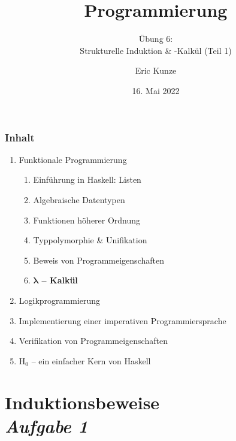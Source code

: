 \documentclass{beamer}
\begin{document}
	
	\title{Programmierung}
	\subtitle{Übung 6: \\ Strukturelle Induktion \& \textlambda-Kalkül (Teil 1)}
	\author{Eric Kunze}
	\date{16. Mai 2022}
	
	\maketitle
	


\begin{frame}[fragile] \frametitle{Inhalt}
	\begin{enumerate}
		\item Funktionale Programmierung
		\begin{enumerate}
			\item Einführung in Haskell: Listen
			\item Algebraische Datentypen
			\item Funktionen höherer Ordnung
			\item Typpolymorphie \& Unifikation
			\item Beweis von Programmeigenschaften
			\item \textbf{$\bm\lambda$ -- Kalkül}
		\end{enumerate}
		\item Logikprogrammierung
		\item Implementierung einer imperativen Programmiersprache
		\item Verifikation von Programmeigenschaften
		\item H${}_\text{0}$ -- ein einfacher Kern von Haskell
	\end{enumerate}
\end{frame}



\section{Induktionsbeweise \\ \textit{\normalsize Aufgabe 1}}
\end{document}

